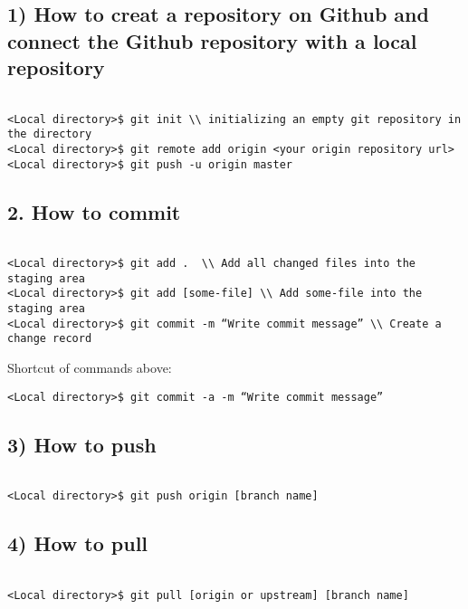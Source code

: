 \documentclass[fleqn,10pt]{wlscirep}
\begin{document}
\subsection*{1) How to creat a repository on Github and connect the Github repository with a local repository}
\begin{verbatim}

<Local directory>$ git init \\ initializing an empty git repository in the directory
<Local directory>$ git remote add origin <your origin repository url>
<Local directory>$ git push -u origin master

\end{verbatim}

\subsection*{2. How to commit}

\begin{verbatim}

<Local directory>$ git add .  \\ Add all changed files into the staging area
<Local directory>$ git add [some-file] \\ Add some-file into the staging area
<Local directory>$ git commit -m “Write commit message” \\ Create a change record

\end{verbatim}
Shortcut of commands above:
\begin{verbatim}
<Local directory>$ git commit -a -m “Write commit message”

\end{verbatim}


\subsection*{3) How to push}
\begin{verbatim}

<Local directory>$ git push origin [branch name]

\end{verbatim}


\subsection*{4) How to pull}
\begin{verbatim}

<Local directory>$ git pull [origin or upstream] [branch name]

\end{verbatim}
\end{document}
